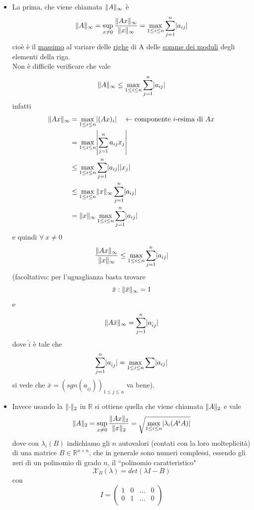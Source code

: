 \begin{itemize}
    \item La prima, che viene chiamata $\lVert A\rVert_{\infty}$ è
    \[\lVert A\rVert_{\infty} = \sup_{x \ne 0} \frac{\lVert Ax\rVert_{\infty}}{\lVert x\rVert_{\infty}} = \max_{1 \le i \le n} \sum_{j=1}^n \lvert a_{ij}\rvert\]
    cioè è il \uline{massimo} al variare delle \uline{righe} di A delle \uline{somme dei moduli} degli elementi della riga.\\
    Non è difficile verificare che vale
    \[\lVert A\rVert_{\infty} \le \max_{1 \le i \le n} \sum_{j=1}^n \lvert a_{ij}\rvert\]
    infatti
    \[\begin{split}
        \norma{Ax}_{\infty} & = \max_{1 \le i \le n} \abs{(Ax)_i} \quad \leftarrow \text{componente } i\text{-esima di } Ax\\
        & = \max_{1 \le i \le n} \abs*{\sum_{j = 1}^n a_{ij}x_j} \\
        & \le \max_{1 \le i \le n} \sum_{j = 1}^n \abs{a_{ij}}\abs{x_j} \\
        & \le \max_{1 \le i \le n} \norma{x}_{\infty} \sum_{j = 1}^n \abs{a_{ij}} \\
        & = \norma{x}_{\infty} \max_{1 \le i \le n} \sum_{j = 1}^n \abs{a_{ij}}
    \end{split}\]
    e quindi $\forall \ x \ne 0$
    \[\frac{\lVert Ax\rVert_{\infty}}{\lVert x\rVert_{\infty}} \le \max_{1 \le i \le n} \sum_{j = 1}^n \lvert a_{ij}\rvert\]
    (facoltativo: per l'uguaglianza basta trovare 
    \[\bar x : \lVert\bar x\rVert_{\infty} = 1\] e 
    \[\lVert A \bar x\rVert_{\infty} = \sum_{j = 1}^n \lvert a_{\hat{i}j}\rvert\]
    dove $\hat{i}$ è tale che
    \[\sum_{j = 1}^n \lvert a_{\hat{i}j}\rvert = \max_{1 \le i \le n} \sum \lvert a_{ij}\rvert\]
    si vede che $\bar x = (sgn(a_{\hat{i}j}))_{1 \le j \le n}$ va bene).
    \item Invece usando la $\lVert\cdot\rVert_2$ in $\mathbb{R}$ si ottiene quella che viene chiamata $\lVert A\rVert_2$ e vale
    \[\norma{A}_2 = \sup_{x \ne 0} \frac{\norma{Ax}_2}{\norma{x}_2} = \sqrt{\max_{1 \le i \le n} \abs*{\lambda_i (A^t A)}}\]
    dove con $\lambda_i (B)$ indichiamo gli $n$ autovalori (contati con la loro molteplicità) di una matrice $B \in \mathbb{R}^{n \times n}$, che in generale sono numeri complessi, essendo gli zeri di un polinomio di grado $n$, il ``polinomio caratteristico"
    \[\mathcal{X}_B(\lambda) = det(\lambda I - B)\] con
    \[I = \begin{pmatrix}
        1 & 0 & \dotso & 0 \\
        0 & 1 & \dotso & 0 \\

\end{pmatrix}\]
\end{itemize}
